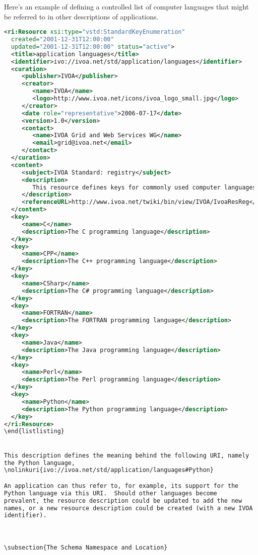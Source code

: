 \documentclass[11pt,a4paper]{ivoa}
\begin{document}
Here's an example of defining a controlled list of computer languages
that might be referred to in other descriptions of applications.

\begin{lstlisting}[language=xml]
<ri:Resource xsi:type="vstd:StandardKeyEnumeration" 
  created="2001-12-31T12:00:00"
  updated="2001-12-31T12:00:00" status="active">
  <title>application languages</title>
  <identifier>ivo://ivoa.net/std/application/languages</identifier>
  <curation>
     <publisher>IVOA</publisher>
     <creator>
        <name>IVOA</name>
        <logo>http://www.ivoa.net/icons/ivoa_logo_small.jpg</logo>
     </creator>
     <date role="representative">2006-07-17</date>
     <version>1.0</version>
     <contact>
        <name>IVOA Grid and Web Services WG</name>
        <email>grid@ivoa.net</email>
     </contact>
  </curation>
  <content>
     <subject>IVOA Standard: registry</subject>
     <description>
        This resource defines keys for commonly used computer languages.
     </description>
     <referenceURL>http://www.ivoa.net/twiki/bin/view/IVOA/IvoaResReg</referenceURL>
  </content>
  <key>
     <name>C</name>
     <description>The C programming language</description>
  </key>
  <key>
     <name>CPP</name>
     <description>The C++ programming language</description>
  </key>
  <key>
     <name>CSharp</name>
     <description>The C# programming language</description>
  </key>
  <key>
     <name>FORTRAN</name>
     <description>The FORTRAN programming language</description>
  </key>
  <key>
     <name>Java</name>
     <description>The Java programming language</description>
  </key>
  <key>
     <name>Perl</name>
     <description>The Perl programming language</description>
  </key>
  <key>
     <name>Python</name>
     <description>The Python programming language</description>
  </key>
</ri:Resource>
\end{listlisting}


This description defines the meaning behind the following URI, namely
the Python language,
\nolinkuri{ivo://ivoa.net/std/application/languages#Python}

An application can thus refer to, for example, its support for the
Python language via this URI.  Should other languages become
prevalent, the resource description could be updated to add the new
names, or a new resource description could be created (with a new IVOA
identifier). 



\subsection{The Schema Namespace and Location}


\end{lstlisting}
\end{document}
